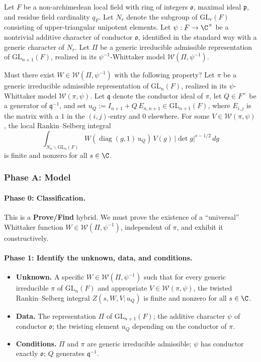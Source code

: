 Let $F$ be a non-archimedean local field with ring of integers $\mathfrak{o}$,
maximal ideal $\mathfrak{p}$, and residue field cardinality $q_F$.
Let $N_r$ denote the subgroup of $\mathrm{GL}_r(F)$ consisting of
upper-triangular unipotent elements. Let $\psi : F \to \C^{\times}$ be a
nontrivial additive character of conductor $\mathfrak{o}$, identified in the
standard way with a generic character of $N_r$. Let $\Pi$ be a generic
irreducible admissible representation of $\mathrm{GL}_{n+1}(F)$, realized in
its $\psi^{-1}$-Whittaker model $\mathcal{W}(\Pi, \psi^{-1})$.

Must there exist $W \in \mathcal{W}(\Pi, \psi^{-1})$ with the following
property? Let $\pi$ be a generic irreducible admissible representation of
$\mathrm{GL}_n(F)$, realized in its $\psi$-Whittaker model
$\mathcal{W}(\pi, \psi)$. Let $\mathfrak{q}$ denote the conductor ideal of
$\pi$, let $Q \in F^{\times}$ be a generator of $\mathfrak{q}^{-1}$, and set
$u_Q := I_{n+1} + Q\,E_{n,n+1} \in \mathrm{GL}_{n+1}(F)$, where $E_{i,j}$
is the matrix with a $1$ in the $(i,j)$-entry and $0$ elsewhere. For some
$V \in \mathcal{W}(\pi, \psi)$, the local Rankin--Selberg integral
\[
  \int_{N_n \backslash \mathrm{GL}_n(F)}
  W\!\left(\operatorname{diag}(g,1)\,u_Q\right)\, V(g)\,
  |\!\det g|^{s-1/2}\, dg
\]
is finite and nonzero for all $s \in \C$.


\subsubsection*{Phase A: Model}

\paragraph{Phase 0: Classification.}
This is a \textbf{Prove/Find} hybrid. We must prove the existence of a
``universal'' Whittaker function $W \in \mathcal{W}(\Pi, \psi^{-1})$,
independent of $\pi$, and exhibit it constructively.

\paragraph{Phase 1: Identify the unknown, data, and conditions.}
\begin{itemize}
\item \textbf{Unknown.} A specific $W \in \mathcal{W}(\Pi, \psi^{-1})$
  such that for every generic irreducible $\pi$ of $\mathrm{GL}_n(F)$ and
  appropriate $V \in \mathcal{W}(\pi, \psi)$, the twisted Rankin--Selberg
  integral $Z(s, W, V; u_Q)$ is finite and nonzero for all $s \in \C$.
\item \textbf{Data.} The representation $\Pi$ of $\mathrm{GL}_{n+1}(F)$;
  the additive character $\psi$ of conductor $\mathfrak{o}$; the twisting
  element $u_Q$ depending on the conductor of $\pi$.
\item \textbf{Conditions.} $\Pi$ and $\pi$ are generic irreducible admissible;
  $\psi$ has conductor exactly $\mathfrak{o}$; $Q$ generates
  $\mathfrak{q}^{-1}$.
\end{itemize}

